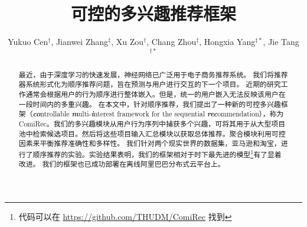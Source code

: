 \documentclass[sigconf]{acmart}
\newcommand{\model}{{ComiRec}}
\begin{document}
\fancyhead{}

\title{可控的多兴趣推荐框架}

\author[Y. Cen, J. Zhang, X. Zou, C. Zhou, H. Yang and J. Tang]{
    Yukuo Cen$^{\dagger}$, Jianwei Zhang$^{\ddagger}$, Xu Zou$^{\dagger}$, Chang Zhou$^{\ddagger}$, Hongxia Yang$^{\ddagger*}$, Jie Tang$^{\dagger*}$
}


\renewcommand{\authors}{Yukuo Cen, Jianwei Zhang, Xu Zou, Chang Zhou, Hongxia Yang and Jie Tang}
\renewcommand{\shortauthors}{Y. Cen et al.}


\begin{abstract}
\renewcommand{\thefootnote}{\fnsymbol{footnote}}
\renewcommand{\thefootnote}{\arabic{footnote}}


最近，由于深度学习的快速发展，神经网络已广泛用于电子商务推荐系统。
我们将推荐器系统形式化为顺序推荐问题，旨在预测与用户进行交互的下一个项目。
近期的研究工作通常会根据用户的行为顺序进行整体嵌入。但是，统一的用户嵌入无法反映该用户在一段时间内的多重兴趣。
在本文中，针对顺序推荐，我们提出了一种新的可控多兴趣框架（\textbf{\textit{co}}ntrollable \textbf{\textit{m}}ulti-\textbf{\textit{i}}nterest framework for the sequential \textbf{\textit{rec}}ommendation），称为 \model。我们的多兴趣模块从用户行为序列中捕获多个兴趣，可将其用于从大型项目池中检索候选项目。然后将这些项目输入汇总模块以获取总体推荐。聚合模块利用可控因素来平衡推荐准确性和多样性。
我们针对两个现实世界的数据集，亚马逊和淘宝，进行了顺序推荐的实验。实验结果表明，我们的框架相对于时下最先进的模型\footnote{代码可以在 \url{https://github.com/THUDM/ComiRec} 找到}有了显着改进。
我们的框架也已成功部署在离线阿里巴巴分布式云平台上。
\end{abstract}
\end{document}
